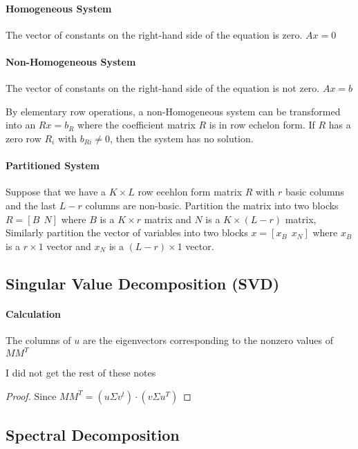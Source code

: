 \documentclass{article}
\theoremstyle{definition}
\theoremstyle{remark}
\begin{document}
\paragraph{Homogeneous System} 

The vector of constants on the right-hand side of the equation is zero. $Ax = 0$

\paragraph{Non-Homogeneous System}

The vector of constants on the right-hand side of the equation is not zero. $Ax = b$

By elementary row operations, a non-Homogeneous system can be transformed into an $Rx = b_R$ where the coefficient matrix $R$ is in row echelon form. If $R$ has a zero row $R_i$ with $b_{Ri} \neq 0$, then the system has no solution. 

\paragraph{Partitioned System}

Suppose that we have a $K \times L$ row ecehlon form matrix $R$ with $r$ basic columns and the last $L - r$ columns are non-basic. Partition the matrix into two blocks $R = [B~~N]$ where $B$ is a $K \times r$ matrix and $N$ is a $K \times (L-r)$ matrix, Similarly partition the vector of variables into two blocks $x = [x_B~~x_N]$ where $x_B$ is a $r \times 1$ vector and $x_N$ is a $(L-r) \times 1$ vector.

\subsection{Singular Value Decomposition (SVD)}

\paragraph{Calculation}
The columns of $u$ are the eigenvectors corresponding to the nonzero values of $MM^T$ 

I did not get the rest of these notes

\begin{proof}
    Since $MM^T = (u\Sigma v^t)\cdot(v \Sigma u^T)$ 
\end{proof}

\subsection{Spectral Decomposition}
\end{document}
